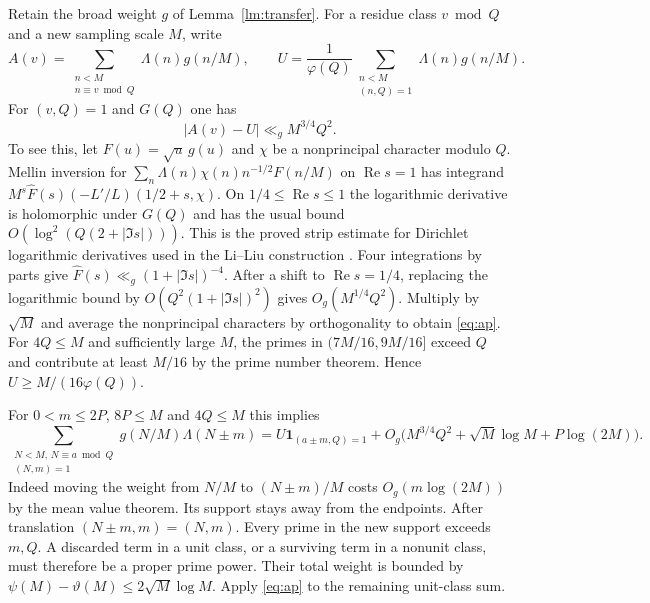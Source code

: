 \documentclass[11pt,a4paper]{article}
\newcommand{\one}{\mathbf 1}
\DeclareMathOperator{\Rea}{Re}
\begin{document}
Retain the broad weight $g$ of Lemma~\ref{lm:transfer}. For a residue class $v\bmod Q$ and a new sampling scale $M$, write
\[
 A(v)=\sum_{\substack{n<M\\n\equiv v\bmod Q}}\Lambda(n)g(n/M),
 \qquad U=\frac1{\varphi(Q)}\sum_{\substack{n<M\\(n,Q)=1}}\Lambda(n)g(n/M).
\]
For $(v,Q)=1$ and $G(Q)$ one has
\begin{equation}\label{eq:ap}
 |A(v)-U|\ll_g M^{3/4}Q^2 .
\end{equation}
To see this, let $F(u)=\sqrt u\,g(u)$ and $\chi$ be a nonprincipal character modulo $Q$. Mellin inversion for $\sum_n\Lambda(n)\chi(n)n^{-1/2}F(n/M)$ on $\Rea s=1$ has integrand $M^s\widehat F(s)(-L'/L)(1/2+s,\chi)$. On $1/4\le\Rea s\le1$ the logarithmic derivative is holomorphic under $G(Q)$ and has the usual bound $O(\log^2(Q(2+|\Im s|)))$. This is the proved strip estimate for Dirichlet logarithmic derivatives used in the Li--Liu construction \cite{LL,LLLean}. Four integrations by parts give $\widehat F(s)\ll_g(1+|\Im s|)^{-4}$. After a shift to $\Rea s=1/4$, replacing the logarithmic bound by $O(Q^2(1+|\Im s|)^2)$ gives $O_g(M^{1/4}Q^2)$. Multiply by $\sqrt M$ and average the nonprincipal characters by orthogonality to obtain \eqref{eq:ap}. For $4Q\le M$ and sufficiently large $M$, the primes in $(7M/16,9M/16]$ exceed $Q$ and contribute at least $M/16$ by the prime number theorem. Hence $U\ge M/(16\varphi(Q))$.

For $0<m\le2P$, $8P\le M$ and $4Q\le M$ this implies
\begin{equation}\label{eq:translate}
 \sum_{\substack{N<M,\,N\equiv a\bmod Q\\(N,m)=1}}g(N/M)\Lambda(N\pm m)
  =U\one_{(a\pm m,Q)=1}+O_g\bigl(M^{3/4}Q^2+\sqrt M\log M+P\log(2M)\bigr).
\end{equation}
Indeed moving the weight from $N/M$ to $(N\pm m)/M$ costs $O_g(m\log(2M))$ by the mean value theorem. Its support stays away from the endpoints. After translation $(N\pm m,m)=(N,m)$. Every prime in the new support exceeds $m,Q$. A discarded term in a unit class, or a surviving term in a nonunit class, must therefore be a proper prime power. Their total weight is bounded by $\psi(M)-\vartheta(M)\le2\sqrt M\log M$. Apply \eqref{eq:ap} to the remaining unit-class sum.
\end{document}

